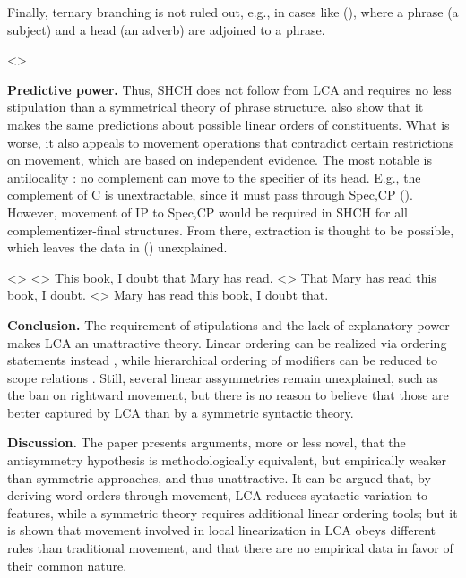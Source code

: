 \documentclass[a4paper, 12pt]{article}
\begin{document}
\begin{sloppypar}
Finally, ternary branching is not ruled out, e.g., in cases like (\nextx), where a phrase (a subject) and a head (an adverb) are adjoined to a phrase.

\ex<>\\
\xe

\textbf{Predictive power.} Thus, SHCH does not follow from LCA and requires no less stipulation than a symmetrical theory of phrase structure. \textcite{abels2012linearasymmetrieslca} also show that it makes the same predictions about possible linear orders of constituents. What is worse, it also appeals to movement operations that contradict certain restrictions on movement, which are based on independent evidence. The most notable is antilocality \parencite[a.m.o.]{abels2003}: no complement can move to the specifier of its head. E.g., the complement of C is unextractable, since it must pass through Spec,CP (\nextx). However, movement of IP to Spec,CP would be required in SHCH for all complementizer-final structures. From there, extraction is thought to be possible, which leaves the data in (\nextx) unexplained.

\pex<>
    \a<> This book, I doubt that Mary has read.
    \a<> That Mary has read this book, I doubt.
    \a<> \ljudge*Mary has read this book, I doubt that.
\xe

\textbf{Conclusion.} The requirement of stipulations and the lack of explanatory power makes LCA an unattractive theory. Linear ordering can be realized via ordering statements instead \parencite[e.g.][]{foxpes2005}, while hierarchical ordering of modifiers can be reduced to scope relations \Parencite[e.g.][]{nilsen2004}. Still, several linear assymmetries remain unexplained, such as the ban on rightward movement, but there is no reason to believe that those are better captured by LCA than by a symmetric syntactic theory.
\pagebreak

\textbf{Discussion.} The paper presents arguments, more or less novel, that the antisymmetry hypothesis is methodologically equivalent, but empirically weaker than symmetric approaches, and thus unattractive. It can be argued that, by deriving word orders through movement, LCA reduces syntactic variation to features, while a symmetric theory requires additional linear ordering tools; but it is shown that movement involved in local linearization in LCA obeys different rules than traditional movement, and that there are no empirical data in favor of their common nature.


\end{sloppypar}
\end{document}
